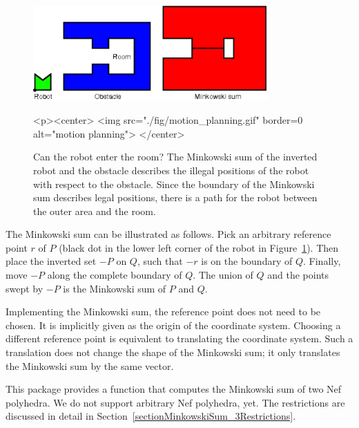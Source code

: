 \begin{figure}
  \begin{ccTexOnly}
    \begin{center}
      \includegraphics[width=0.8\textwidth]{Minkowski_sum_3/fig/motion_planning}
    \end{center}
  \end{ccTexOnly}
  \begin{ccHtmlOnly}
    <p><center>
    <img src="./fig/motion_planning.gif" border=0 alt="motion
    planning">
    </center>
  \end{ccHtmlOnly}
  \caption{Can the robot enter the room? The Minkowski sum of the inverted
           robot and the obstacle describes the illegal positions of the 
           robot with respect to the obstacle. 
           Since the boundary of the Minkowski sum describes legal
           positions, there
           is a path for the robot between the outer area and the room.}
  \label{fig:motionPlanning}
\end{figure}

The Minkowski sum can be illustrated as follows. Pick an arbitrary
reference point $r$ of $P$ (black dot in the lower left corner of the
robot in Figure~\ref{fig:motionPlanning}). Then place the inverted set
$-P$ on $Q$, such that $-r$ is on the boundary of $Q$. Finally, move
$-P$ along the complete boundary of $Q$. The union of $Q$ and the
points swept by $-P$ is the Minkowski sum of $P$ and $Q$.

Implementing the Minkowski sum, the reference point does not need to
be chosen. It is implicitly given as the origin of the coordinate
system. Choosing a different reference point is equivalent to
translating the coordinate system. Such a translation does not change
the shape of the Minkowski sum; it only translates the Minkowski sum
by the same vector.

This package provides a function  that computes
the Minkowski sum of two Nef polyhedra. We do not support arbitrary
Nef polyhedra, yet. The restrictions are discussed in detail in
Section~\ref{sectionMinkowskiSum_3Restrictions}.

